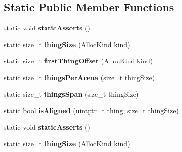 \subsection*{Static Public Member Functions}
\begin{DoxyCompactItemize}
\item 
\hypertarget{structjs_1_1gc_1_1_arena_a1a94add592243d9b73968773819515c9}{static void {\bfseries static\-Asserts} ()}\label{structjs_1_1gc_1_1_arena_a1a94add592243d9b73968773819515c9}

\item 
\hypertarget{structjs_1_1gc_1_1_arena_ac3ed10e5df1bf0c8e0a5f3e98f4d4e58}{static size\-\_\-t {\bfseries thing\-Size} (Alloc\-Kind kind)}\label{structjs_1_1gc_1_1_arena_ac3ed10e5df1bf0c8e0a5f3e98f4d4e58}

\item 
\hypertarget{structjs_1_1gc_1_1_arena_aa6f4ad7523f0304e607c7c1e2e11c529}{static size\-\_\-t {\bfseries first\-Thing\-Offset} (Alloc\-Kind kind)}\label{structjs_1_1gc_1_1_arena_aa6f4ad7523f0304e607c7c1e2e11c529}

\item 
\hypertarget{structjs_1_1gc_1_1_arena_a17f2d552fece242df408d08fbe5d527a}{static size\-\_\-t {\bfseries things\-Per\-Arena} (size\-\_\-t thing\-Size)}\label{structjs_1_1gc_1_1_arena_a17f2d552fece242df408d08fbe5d527a}

\item 
\hypertarget{structjs_1_1gc_1_1_arena_a37f6e77deca908eeff8296d8ed51febb}{static size\-\_\-t {\bfseries things\-Span} (size\-\_\-t thing\-Size)}\label{structjs_1_1gc_1_1_arena_a37f6e77deca908eeff8296d8ed51febb}

\item 
\hypertarget{structjs_1_1gc_1_1_arena_a5f966fe2c6cee04082b62fcd9b72f64c}{static bool {\bfseries is\-Aligned} (uintptr\-\_\-t thing, size\-\_\-t thing\-Size)}\label{structjs_1_1gc_1_1_arena_a5f966fe2c6cee04082b62fcd9b72f64c}

\item 
\hypertarget{structjs_1_1gc_1_1_arena_a1a94add592243d9b73968773819515c9}{static void {\bfseries static\-Asserts} ()}\label{structjs_1_1gc_1_1_arena_a1a94add592243d9b73968773819515c9}

\item 
\hypertarget{structjs_1_1gc_1_1_arena_ac3ed10e5df1bf0c8e0a5f3e98f4d4e58}{static size\-\_\-t {\bfseries thing\-Size} (Alloc\-Kind kind)}\label{structjs_1_1gc_1_1_arena_ac3ed10e5df1bf0c8e0a5f3e98f4d4e58}


\end{DoxyCompactItemize}
